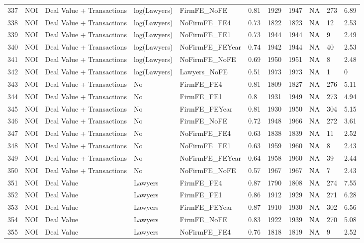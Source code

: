 \documentclass{article}
\begin{document}
\begin{table}[H]
\begin{tabular}{rllllllllll}
  337 & NOI & Deal Value + Transactions & log(Lawyers) & FirmFE\_NoFE & 0.81 & 1929 & 1947 & NA & 273 & 6.89 \\
  338 & NOI & Deal Value + Transactions & log(Lawyers) & NoFirmFE\_FE4 & 0.73 & 1822 & 1823 & NA & 12 & 2.53 \\
  339 & NOI & Deal Value + Transactions & log(Lawyers) & NoFirmFE\_FE1 & 0.73 & 1944 & 1944 & NA & 9 & 2.49 \\
  340 & NOI & Deal Value + Transactions & log(Lawyers) & NoFirmFE\_FEYear & 0.74 & 1942 & 1944 & NA & 40 & 2.53 \\
  341 & NOI & Deal Value + Transactions & log(Lawyers) & NoFirmFE\_NoFE & 0.69 & 1950 & 1951 & NA & 8 & 2.48 \\
  342 & NOI & Deal Value + Transactions & log(Lawyers) & Lawyers\_NoFE & 0.51 & 1973 & 1973 & NA & 1 & 0 \\
  343 & NOI & Deal Value + Transactions & No & FirmFE\_FE4 & 0.81 & 1809 & 1827 & NA & 276 & 5.11 \\
  344 & NOI & Deal Value + Transactions & No & FirmFE\_FE1 & 0.8 & 1931 & 1949 & NA & 273 & 4.94 \\
  345 & NOI & Deal Value + Transactions & No & FirmFE\_FEYear & 0.81 & 1930 & 1950 & NA & 304 & 5.15 \\
  346 & NOI & Deal Value + Transactions & No & FirmFE\_NoFE & 0.72 & 1948 & 1966 & NA & 272 & 3.61 \\
  347 & NOI & Deal Value + Transactions & No & NoFirmFE\_FE4 & 0.63 & 1838 & 1839 & NA & 11 & 2.52 \\
  348 & NOI & Deal Value + Transactions & No & NoFirmFE\_FE1 & 0.63 & 1959 & 1960 & NA & 8 & 2.43 \\
  349 & NOI & Deal Value + Transactions & No & NoFirmFE\_FEYear & 0.64 & 1958 & 1960 & NA & 39 & 2.44 \\
  350 & NOI & Deal Value + Transactions & No & NoFirmFE\_NoFE & 0.57 & 1967 & 1967 & NA & 7 & 2.43 \\
  351 & NOI & Deal Value & Lawyers & FirmFE\_FE4 & 0.87 & 1790 & 1808 & NA & 274 & 7.55 \\
  352 & NOI & Deal Value & Lawyers & FirmFE\_FE1 & 0.86 & 1912 & 1929 & NA & 271 & 6.28 \\
  353 & NOI & Deal Value & Lawyers & FirmFE\_FEYear & 0.87 & 1910 & 1930 & NA & 302 & 6.56 \\
  354 & NOI & Deal Value & Lawyers & FirmFE\_NoFE & 0.83 & 1922 & 1939 & NA & 270 & 5.08 \\
  355 & NOI & Deal Value & Lawyers & NoFirmFE\_FE4 & 0.76 & 1818 & 1819 & NA & 9 & 2.52 \\

\end{tabular}
\end{table}
\end{document}
